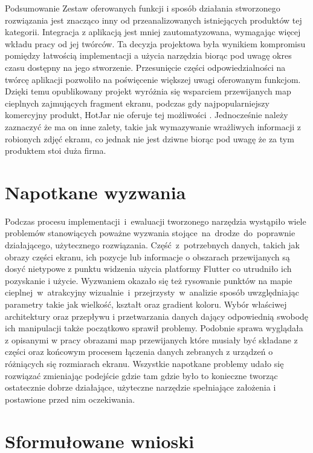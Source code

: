 \begin{chapter}{Podsumowanie}
	Zestaw oferowanych funkcji i sposób działania stworzonego rozwiązania jest znacząco inny od przeanalizowanych istniejących produktów tej kategorii. Integracja z aplikacją jest mniej zautomatyzowana, wymagając więcej wkładu pracy od jej twórców. Ta decyzja projektowa była wynikiem kompromisu pomiędzy łatwością implementacji a użycia narzędzia biorąc pod uwagę okres czasu dostępny na jego stworzenie. Przesunięcie części odpowiedzialności na twórcę aplikacji pozwoliło na poświęcenie większej uwagi oferowanym funkcjom. Dzięki temu opublikowany projekt wyróżnia się wsparciem przewijanych map cieplnych zajmujących fragment ekranu, podczas gdy najpopularniejszy komercyjny produkt, HotJar nie oferuje tej możliwości \cite{Hotjar_limitations}. Jednocześnie należy zaznaczyć że ma on inne zalety, takie jak wymazywanie wrażliwych informacji z robionych zdjęć ekranu, co jednak nie jest dziwne biorąc pod uwagę że za tym produktem stoi duża firma.
		
	\section{Napotkane wyzwania}
	Podczas procesu implementacji~i~ewaluacji tworzonego narzędzia wystąpiło wiele problemów stanowiących poważne wyzwania stojące~na~drodze~do~poprawnie działającego, użytecznego rozwiązania. Część~z~potrzebnych danych, takich jak obrazy części ekranu, ich pozycje lub informacje o obszarach przewijanych są dosyć nietypowe z punktu widzenia użycia platformy Flutter co utrudniło ich pozyskanie i użycie. Wyzwaniem okazało się też rysowanie punktów na mapie cieplnej~w~atrakcyjny wizualnie~i~przejrzysty~w~analizie sposób uwzględniając parametry takie jak wielkość, kształt oraz gradient koloru. Wybór właściwej architektury oraz przepływu i przetwarzania danych dający odpowiednią swobodę ich manipulacji także początkowo sprawił problemy. Podobnie sprawa wyglądała z opisanymi w pracy obrazami map przewijanych które musiały być składane z części oraz końcowym procesem łączenia danych zebranych z urządzeń o różniących się rozmiarach ekranu. Wszystkie napotkane problemy udało się rozwiązać zmieniając podejście gdzie tam gdzie było to konieczne tworząc ostatecznie dobrze działające, użyteczne narzędzie spełniające założenia i postawione przed nim oczekiwania.
	
	\section{Sformułowane wnioski}

\end{chapter}
